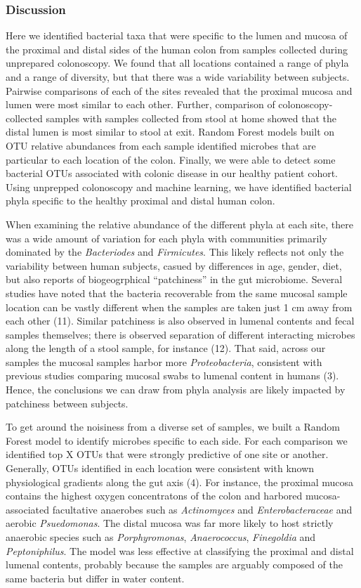 \documentclass[11pt,]{article}
\begin{document}
\subsubsection{Discussion}\label{discussion}

Here we identified bacterial taxa that were specific to the lumen and
mucosa of the proximal and distal sides of the human colon from samples
collected during unprepared colonoscopy. We found that all locations
contained a range of phyla and a range of diversity, but that there was
a wide variability between subjects. Pairwise comparisons of each of the
sites revealed that the proximal mucosa and lumen were most similar to
each other. Further, comparison of colonoscopy-collected samples with
samples collected from stool at home showed that the distal lumen is
most similar to stool at exit. Random Forest models built on OTU
relative abundances from each sample identified microbes that are
particular to each location of the colon. Finally, we were able to
detect some bacterial OTUs associated with colonic disease in our
healthy patient cohort. Using unprepped colonoscopy and machine
learning, we have identified bacterial phyla specific to the healthy
proximal and distal human colon.

When examining the relative abundance of the different phyla at each
site, there was a wide amount of variation for each phyla with
communities primarily dominated by the \emph{Bacteriodes} and
\emph{Firmicutes}. This likely reflects not only the variability between
human subjects, casued by differences in age, gender, diet, but also
reports of biogeogrphical ``patchiness'' in the gut microbiome. Several
studies have noted that the bacteria recoverable from the same mucosal
sample location can be vastly different when the samples are taken just
1 cm away from each other (11). Similar patchiness is also observed in
lumenal contents and fecal samples themselves; there is observed
separation of different interacting microbes along the length of a stool
sample, for instance (12). That said, across our samples the mucosal
samples harbor more \emph{Proteobacteria}, consistent with previous
studies comparing mucosal swabs to lumenal content in humans (3). Hence,
the conclusions we can draw from phyla analysis are likely impacted by
patchiness between subjects.

To get around the noisiness from a diverse set of samples, we built a
Random Forest model to identify microbes specific to each side. For each
comparison we identified top X OTUs that were strongly predictive of one
site or another. Generally, OTUs identified in each location were
consistent with known physiological gradients along the gut axis (4).
For instance, the proximal mucosa contains the highest oxygen
concentratons of the colon and harbored mucosa-associated facultative
anaerobes such as \emph{Actinomyces} and \emph{Enterobacteraceae} and
aerobic \emph{Psuedomonas}. The distal mucosa was far more likely to
host strictly anaerobic species such as \emph{Porphyromonas},
\emph{Anaerococcus}, \emph{Finegoldia} and \emph{Peptoniphilus}. The
model was less effective at classifying the proximal and distal lumenal
contents, probably because the samples are arguably composed of the same
bacteria but differ in water content.
\end{document}
